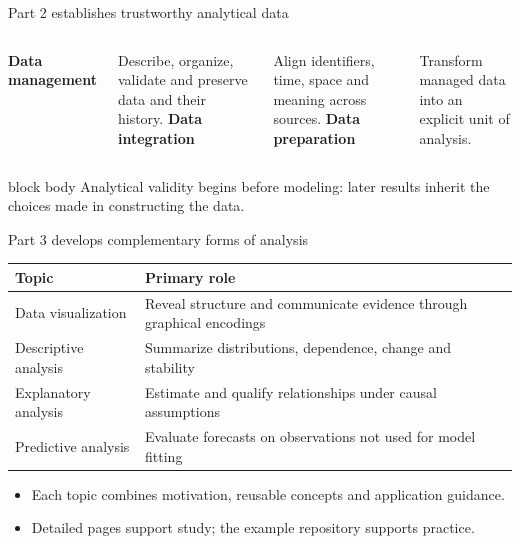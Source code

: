\documentclass[10pt,aspectratio=169]{beamer}
\begin{document}
\begin{frame}{Part 2 establishes trustworthy analytical data}
\small
\begin{columns}[T]
\centering
\textbf{Data management}

\scriptsize Describe, organize, validate and preserve data and their history.
\centering
\textbf{Data integration}

\scriptsize Align identifiers, time, space and meaning across sources.
\centering
\textbf{Data preparation}

\scriptsize Transform managed data into an explicit unit of analysis.
\end{columns}
\vspace{0.65cm}
\begin{beamercolorbox}[rounded=true,sep=9pt]{block body}
Analytical validity begins before modeling: later results inherit the choices made in constructing the data.
\end{beamercolorbox}
\end{frame}

\begin{frame}{Part 3 develops complementary forms of analysis}
\small
\begin{tabularx}{\textwidth}{lX}
\toprule
\textbf{Topic} & \textbf{Primary role} \\
\midrule
Data visualization & Reveal structure and communicate evidence through graphical encodings \\
Descriptive analysis & Summarize distributions, dependence, change and stability \\
Explanatory analysis & Estimate and qualify relationships under causal assumptions \\
Predictive analysis & Evaluate forecasts on observations not used for model fitting \\
\bottomrule
\end{tabularx}
\vspace{0.45cm}
\begin{itemize}
  \item Each topic combines motivation, reusable concepts and application guidance.
  \item Detailed pages support study; the example repository supports practice.
\end{itemize}
\end{frame}
\end{document}
